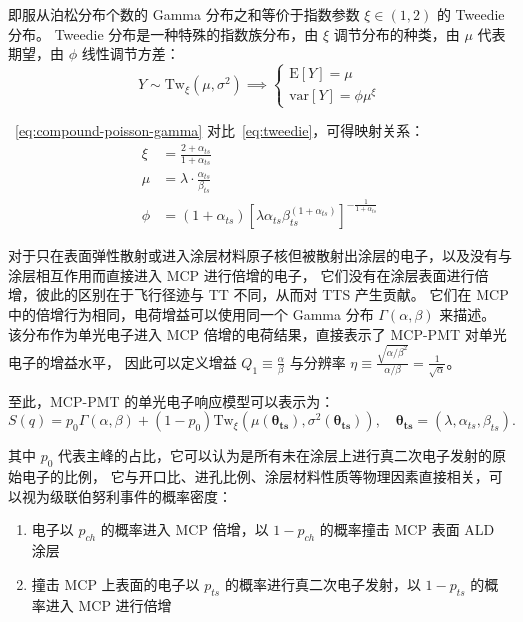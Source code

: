 即服从泊松分布个数的 Gamma 分布之和等价于指数参数 $\xi\in(1, 2)$ 的 Tweedie 分布。
Tweedie 分布是一种特殊的指数族分布，由 $\xi$ 调节分布的种类，由 $\mu$ 代表期望，由 $\phi$ 线性调节方差：
\begin{equation}
    Y\sim\mathrm{Tw}_{\xi}(\mu, \sigma^2)\implies 
    \left\{
        \begin{array}{c}
        \mathrm{E}[Y]=\mu \\
        \mathrm{var}[Y]=\phi\mu^{\xi}
        \end{array}
    \right.
    \label{eq:tweedie}
\end{equation}

~\eqref{eq:compound-poisson-gamma} 对比~\eqref{eq:tweedie}，可得映射关系：
\begin{align}
    \xi & = \frac{2+\alpha_{ts}}{1+\alpha_{ts}}\\
    \mu & = \lambda\cdot\frac{\alpha_{ts}}{\beta_{ts}}\\
    \phi & = (1+\alpha_{ts})\left[\lambda\alpha_{ts}\beta_{ts}^{(1+\alpha_{ts})}\right]^{-\frac{1}{1+\alpha_{ts}}}
\end{align}

对于只在表面弹性散射或进入涂层材料原子核但被散射出涂层的电子，以及没有与涂层相互作用而直接进入 MCP 进行倍增的电子，
它们没有在涂层表面进行倍增，彼此的区别在于飞行径迹与 TT 不同，从而对 TTS 产生贡献。
它们在 MCP 中的倍增行为相同，电荷增益可以使用同一个 Gamma 分布 $\Gamma(\alpha, \beta)$ 来描述。
该分布作为单光电子进入 MCP 倍增的电荷结果，直接表示了 MCP-PMT 对单光电子的增益水平，
因此可以定义增益 $Q_1\equiv\frac{\alpha}{\beta}$ 与分辨率 $\eta\equiv\frac{\sqrt{\alpha/\beta^2}}{\alpha/\beta}=\frac{1}{\sqrt{\alpha}}$。

至此，MCP-PMT 的单光电子响应模型可以表示为：
\begin{equation}
    S(q)=p_0\Gamma(\alpha, \beta)+(1-p_0)\mathrm{Tw}_{\xi}
    \left(\mu(\boldsymbol{\theta_{ts}}),\sigma^2(\boldsymbol{\theta_{ts}})\right),\quad
    \boldsymbol{\theta_{ts}}=(\lambda, \alpha_{ts},\beta_{ts}).
\end{equation}

其中 $p_0$ 代表主峰的占比，它可以认为是所有未在涂层上进行真二次电子发射的原始电子的比例，
它与开口比、进孔比例、涂层材料性质等物理因素直接相关，可以视为级联伯努利事件的概率密度：
\begin{enumerate}
    \item 电子以 $p_{ch}$ 的概率进入 MCP 倍增，以 $1-p_{ch}$ 的概率撞击 MCP 表面 ALD 涂层
    \item 撞击 MCP 上表面的电子以 $p_{ts}$ 的概率进行真二次电子发射，以 $1-p_{ts}$ 的概率进入 MCP 进行倍增
\end{enumerate}

